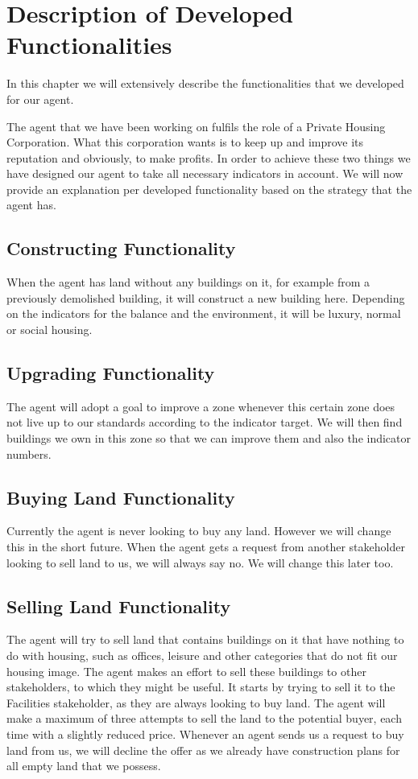 \chapter[Description of Developed Functionalities]{Description of Developed \\ Functionalities}
In this chapter we will extensively describe the functionalities that we developed for our agent.

The agent that we have been working on fulfils the role of a Private Housing Corporation. What this corporation wants is to keep up and improve its reputation and obviously, to make profits. In order to achieve these two things we have designed our agent to take all necessary indicators in account. We will now provide an explanation per developed functionality based on the strategy that the agent has.

\section{Constructing Functionality}
When the agent has land without any buildings on it, for example from a previously demolished building, it will construct a new building here. Depending on the indicators for the balance and the environment, it will be luxury, normal or social housing.

\section{Upgrading Functionality}
The agent will adopt a goal to improve a zone whenever this certain zone does not live up to our standards according to the indicator target. We will then find buildings we own in this zone so that we can improve them and also the indicator numbers. 

\section{Buying Land Functionality}
Currently the agent is never looking to buy any land. However we will change this in the short future. When the agent gets a request from another stakeholder looking to sell land to us, we will always say no. We will change this later too. 

\section{Selling Land Functionality}
The agent will try to sell land that contains buildings on it that have nothing to do with housing, such as offices, leisure and other categories that do not fit our housing image. The agent makes an effort to sell these buildings to other stakeholders, to which they might be useful. It starts by trying to sell it to the Facilities stakeholder, as they are always looking to buy land. The agent will make a maximum of three attempts to sell the land to the potential buyer, each time with a slightly reduced price.
Whenever an agent sends us a request to buy land from us, we will decline the offer as we already have construction plans for all empty land that we possess.


